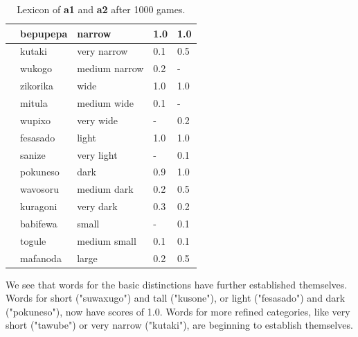 \begin{table}
\begin{center}
\begin{tabular}{ l  l  l  l  l } \midrule
[WIDTH 0.0-0.5]&bepupepa&narrow & 1.0&1.0\\ \midrule
 [WIDTH 0.0-0.25]&kutaki&very narrow & 0.1&0.5\\ \midrule
 [WIDTH 0.25-0.5]&wukogo&medium narrow & 0.2&-\\ \midrule
[WIDTH 0.5-1.0]&zikorika&wide & 1.0&1.0\\ \midrule
 [WIDTH 0.5-0.75]&mitula&medium wide &0.1&-\\ \midrule
 [WIDTH 0.75-1.0]&wupixo&very wide & -&0.2\\ \midrule
[GRAY 0.0-0.5]&fesasado&light & 1.0&1.0\\ \midrule
 [GRAY 0.0-0.25]&sanize&very light & -&0.1\\ \midrule
[GRAY 0.5-1.0]&pokuneso&dark &0.9&1.0\\ \midrule
 [GRAY 0.5-0.75]&wavosoru&medium dark & 0.2&0.5\\ \midrule
 [GRAY 0.75-1.0]&kuragoni&very dark &0.3&0.2\\ \midrule
[AREA 0.0-0.5]&babifewa&small & -&0.1\\ \midrule
 [AREA 0.25-0.5]&togule&medium small & 0.1&0.1\\ \midrule
[AREA 0.5-1.0]&mafanoda&large & 0.2&0.5\\ \midrule
\end{tabular}
\caption{\label{tab:lex500b} Lexicon of {\bf a1} and {\bf a2} after 1000 games.}
\end{center}
\end{table}

We see that words for the basic distinctions have further established
themselves. Words for short ("suwaxugo") and tall ("kusone"), or light ("fesasado") and dark 
("pokuneso"), now have scores of 1.0. Words for more refined categories, like very short ("tawube") or 
very narrow ("kutaki"), are beginning to establish themselves.  

